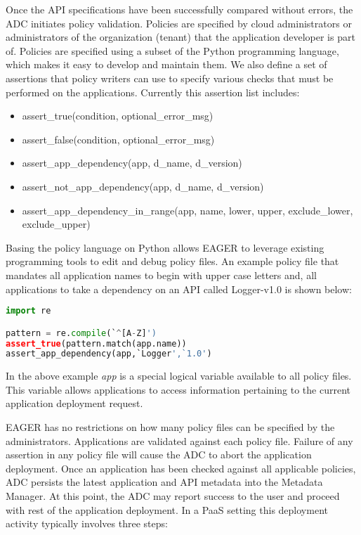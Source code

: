 Once the API specifications have been successfully compared without errors,
the ADC initiates policy validation. Policies are specified by cloud
administrators or administrators of the organization (tenant) that the
application developer is part of. Policies are specified using a subset of the
Python programming language, 
which makes it easy to develop and maintain them.
We also define a set of assertions
that policy writers can use to specify various checks that must be performed
on the applications. 
Currently this assertion list includes:
\begin{itemize}
\item assert\_true(condition, optional\_error\_msg)
\item assert\_false(condition, optional\_error\_msg)
\item assert\_app\_dependency(app, d\_name, d\_version)
\item assert\_not\_app\_dependency(app, d\_name, d\_version)
\item assert\_app\_dependency\_in\_range(app, name, lower, upper, exclude\_lower, exclude\_upper)
\end{itemize}

Basing the policy language on Python allows EAGER to leverage
existing programming tools to edit and debug policy files. An example policy
file that mandates all application names to begin with upper case letters and,
all applications to take a dependency on an API called Logger-v1.0 is shown
below:

\begin{lstlisting}[language=Python, frame=single]
import re

pattern = re.compile(`^[A-Z]')
assert_true(pattern.match(app.name))
assert_app_dependency(app,`Logger',`1.0')
\end{lstlisting}

In the above example \textit{app} is a special logical variable available to
all policy files. This variable allows applications to access information
pertaining to the current application deployment request. 

EAGER has no restrictions on how many policy files can be specified by the
administrators. Applications are validated against each policy file. Failure
of any assertion in any policy file will cause the ADC to abort the
application deployment. Once an application has been checked against all
applicable policies, ADC persists the latest application and API metadata into
the Metadata Manager.  At this point, the ADC may report success to the user
and proceed with rest of the application deployment. In a PaaS setting
this deployment
activity typically involves three
steps:

